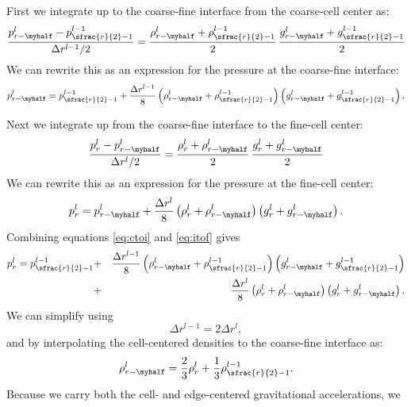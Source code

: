 First we integrate up to the
coarse-fine interface from the coarse-cell center as:
\begin{equation}
\frac{p_{r-\myhalf}^l - p_{\sfrac{r}{2}-1}^{l-1}}{\Delta r^{l-1}/2} = 
  \frac{\rho_{r-\myhalf}^l + \rho_{\sfrac{r}{2}-1}^{l-1}}{2}  \,
  \frac{g_{r-\myhalf}^l + g_{\sfrac{r}{2}-1}^{l-1}}{2} 
\end{equation}
We can rewrite this as an expression for the pressure at the coarse-fine interface:
\begin{equation}
 p_{r-\myhalf}^l = p_{\sfrac{r}{2}-1}^{l-1} + \frac{\Delta r^{l-1}}{8}
  \left(\rho_{r-\myhalf}^l + \rho_{\sfrac{r}{2}-1}^{l-1}\right)
  \left(g_{r-\myhalf}^l + g_{\sfrac{r}{2}-1}^{l-1}\right).
  \label{eq:ctoi}
\end{equation}

Next we integrate up from the coarse-fine interface to the fine-cell center:
\begin{equation}
\frac{p_r^l - p_{r-\myhalf}^l}{\Delta r^l/2} = 
  \frac{\rho_r^l + \rho_{r-\myhalf}^l}{2} \,
  \frac{g_r^l + g_{r-\myhalf}^l}{2}
\end{equation}
We can rewrite this as an expression for the pressure at the fine-cell center:
\begin{equation}
p_r^l = p_{r-\myhalf}^l + \frac{\Delta r^l}{8}
  \left(\rho_r^l + \rho_{r-\myhalf}^l\right)
  \left(g_r^l + g_{r-\myhalf}^l\right).
  \label{eq:itof}
\end{equation}
Combining equations \ref{eq:ctoi} and \ref{eq:itof} gives
\begin{eqnarray}
p_r^l = p_{\sfrac{r}{2}-1}^{l-1} &+& 
     \frac{\Delta r^{l-1}}{8} \left(\rho_{r-\myhalf}^l + \rho_{\sfrac{r}{2}-1}^{l-1}\right)
                                \left(   g_{r-\myhalf}^l +    g_{\sfrac{r}{2}-1}^{l-1}\right) \nonumber \\
 &+& \frac{\Delta r^l}{8} \left(\rho_r^l + \rho_{r-\myhalf}^l\right)
                            \left(   g_r^l +    g_{r-\myhalf}^l\right).
\end{eqnarray}
We can simplify using
\begin{equation}
\Delta r^{l-1} = 2\Delta r^l,
\end{equation}
and by interpolating the cell-centered densities to the coarse-fine interface as:
\begin{equation}
\rho_{r-\myhalf}^l = \frac{2}{3}\rho_r^l + \frac{1}{3}\rho_{\sfrac{r}{2}-1}^{l-1}.
\end{equation}
Because we carry both the cell- and edge-centered gravitational accelerations, we
